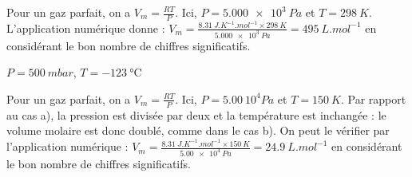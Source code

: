 
\begin{corrige}
Pour un gaz parfait, on a $V_m=\frac{RT}{P}$. Ici, $P= \SI{5,000e3}{Pa}$
 et $T=\SI{298}{K}$. L'application numérique donne : 
 $V_m = \frac{ \SI{8,31}{J.K^{-1}.mol^{-1}}
 \times \SI{298}{K}}{\SI{5,000e3}{Pa}}=\SI{495}{L.mol^{-1}}$
en considérant le bon nombre de chiffres significatifs.
\end{corrige}




\begin{enonce}
$P=\SI{500}{mbar}$, $T=\SI{-123}{\celsius}$
\end{enonce}



\begin{corrige}
Pour un gaz parfait, on a $V_m=\frac{RT}{P}$. Ici, $P= \SI{5,00}{10^4Pa}$
et $T=\SI{150}{K}$.
Par rapport au cas a), la pression est divisée par deux et la température est inchangée : le volume molaire est donc doublé, comme dans le cas b). On peut le vérifier par l'application numérique : 
 $V_m = \frac{ \SI{8,31}{J.K^{-1}.mol^{-1}}
 \times \SI{150}{K}}{\SI{5,00e4}{Pa}}=\SI{24,9}{L.mol^{-1}}$
 en considérant le bon nombre de chiffres significatifs.
\end{corrige}


\finEntrainement




\hauteurLargeurCadreReponse		{8mm}{1.5cm}
\initialisationEntrainement


